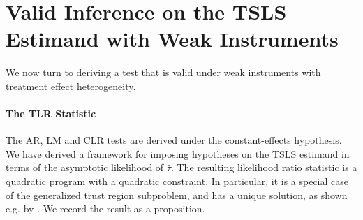\section{Valid Inference on the TSLS Estimand with Weak Instruments}
\label{sec:results}

We now turn to deriving a test that is valid under  weak instruments with treatment effect heterogeneity.

\paragraph*{The TLR Statistic}

The AR, LM and CLR tests are derived under the constant-effects hypothesis. We have derived a framework for imposing hypotheses on the TSLS estimand in terms of the asymptotic likelihood of \(\hat \tau\). The resulting likelihood ratio statistic is a quadratic program with a quadratic constraint. In particular, it is a special case of the generalized trust region subproblem, and has a unique solution, as shown e.g. by \cite{sternIndefiniteTrustRegion1995}. We record the result as a proposition.



